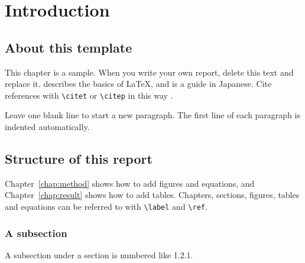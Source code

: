 \chapter{Introduction}\label{chap:intro}

\section{About this template}
This chapter is a sample. When you write your own report, delete this text and replace it.
\citet{lamport1994} describes the basics of \LaTeX, and \citet{okumura2020} is a guide in Japanese.
Cite references with \verb|\citet| or \verb|\citep| in this way \citep{lamport1994}.

Leave one blank line to start a new paragraph.
The first line of each paragraph is indented automatically.

\section{Structure of this report}
Chapter~\ref{chap:method} shows how to add figures and equations, and Chapter~\ref{chap:result} shows how to add tables.
Chapters, sections, figures, tables and equations can be referred to with \verb|\label| and \verb|\ref|.

\subsection{A subsection}
A subsection under a section is numbered like 1.2.1.
